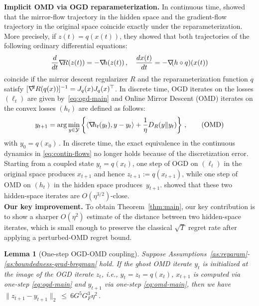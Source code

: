 \documentclass[a4paper,11pt,fullpage]{article}
\def\Y{{\mathcal Y}}
\theoremstyle{plain}
\newtheorem{lemma}{Lemma}
\theoremstyle{definition}
\theoremstyle{plain}
\renewcommand{\leq}{~\le~}
\let\nablaold\nabla
\renewcommand{\nabla}{\nablaold\mkern-2.5mu}
\begin{document}
\noindent\textbf{Implicit OMD via OGD reparameterization.} In continuous time, \citet{amid2020reparameterizing} showed that 
the mirror-flow trajectory in the hidden space and the gradient-flow trajectory in the original space coincide exactly under the reparameterization. 
More precisely, if $z(t)=q(x(t))$, they showed that both trajectories of the following ordinary differential equations: 
\begin{equation}
\label{eq:contin-flows}
\frac{d}{dt}\nabla R(z(t)) = -\nabla h(z(t))\,, 
\quad \frac{dx(t)}{dt} = -\nabla (h\circ q)(x(t))
\end{equation}
coincide if the mirror descent regularizer $R$ 
and the reparameterization function $q$ satisfy $[\nabla^2R(q(x))]^{-1} = J_q(x)J_q(x)^\top$. 
In discrete time, OGD iterates on the losses $(\ell_t)$ are given by~\eqref{eq:ogd-main} and Online Mirror Descent (OMD) iterates on the convex losses $(h_t)$ are defined as follows: 
\begin{equation}
y_{t+1} =
\arg\min_{y\in\Y}
    \left\{
        \langle \nabla h_t(y_t),y-y_t\rangle
        +
        \frac1\eta D_R(y\|y_t)
    \right\}\,,
    \tag{OMD}
    \label{eq:omd-main}
\end{equation}
with $y_0 = q(x_0)\,.$ 
In discrete time, the exact equivalence in the continuous dynamics in \eqref{eq:contin-flows} no longer holds because of the discretization error. 
Starting from a coupled state $y_t=q(x_t)$, one step of OGD on $(\ell_t)$ in the original space produces \(x_{t+1}\) and hence $z_{t+1}:=q(x_{t+1})$, while one step of OMD on $(h_t)$ in the hidden space produces~$y_{t+1}$. 
\citet{ghai-lu-hazan22} showed that these two hidden-space iterates are \(O(\eta^{3/2})\)-close.\\ 

\noindent\textbf{Our key improvement.} To obtain Theorem~\ref{thm:main}, our key contribution is to show a sharper $O(\eta^{2})$ estimate of the distance between two hidden-space iterates, which is small enough to preserve the classical $\sqrt T$ regret rate after applying a perturbed-OMD regret bound.

    \begin{lemma}[One-step OGD-OMD coupling]
    \label{prop:dist-minimizers-eta2-main}
    Suppose Assumptions~\ref{as:reparam}-\ref{as:boundedness-grad-bregman} hold. If the ghost OMD iterate $y_t$ is initialized at the image of the OGD iterate $z_t$, i.e., $y_t=z_t=q(x_t)$, $x_{t+1}$ is computed via one-step  \eqref{eq:ogd-main} and $y_{t+1}$ via one-step \eqref{eq:omd-main}, then we have  $\|z_{t+1} - y_{t+1}\|_2 \leq 6G^5G_F^3\eta^2\,.$
    \end{lemma}
\end{document}
